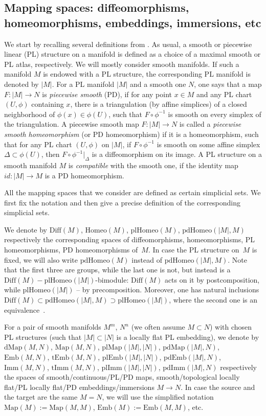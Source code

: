 \documentclass[11pt]{amsart}
\theoremstyle{definition}
\newcommand{\Emb}{\mathrm{Emb}}
\newcommand{\Imm}{\mathrm{Imm}}
\newcommand{\tImm}{\mathrm{tImm}}
\newcommand{\plImm}{\mathrm{plImm}}
\newcommand{\pdImm}{\mathrm{pdImm}}
\newcommand{\tEmb}{\mathrm{tEmb}}
\newcommand{\plEmb}{\mathrm{plEmb}}
\newcommand{\pdEmb}{\mathrm{pdEmb}}
\newcommand{\Map}{\mathrm{Map}}
\newcommand{\dMap}{\mathrm{dMap}}
\newcommand{\plMap}{\mathrm{plMap}}
\newcommand{\pdMap}{\mathrm{pdMap}}
\newcommand{\Diff}{\mathrm{Diff}}
\newcommand{\Homeo}{\mathrm{Homeo}}
\newcommand{\plHomeo}{\mathrm{plHomeo}}
\newcommand{\pdHomeo}{\mathrm{pdHomeo}}
\numberwithin{equation}{section}
\begin{document}
\subsection{Mapping spaces: diffeomorphisms, homeomorphisms, embeddings, immersions, etc}\label{ss:spaces}
We start by recalling several definitions from \cite{BLR_aut}.
As  usual, a smooth or piecewise linear (PL) structure on a manifold is defined as a choice of a maximal smooth or PL atlas, respectively. We will mostly consider smooth manifolds. 
If such a manifold $M$ is endowed with a  PL structure, the corresponding PL manifold is denoted by $|M|$. For a PL manifold $|M|$ and
a smooth one $N$, one says that a map $F\colon |M|\to N$ is {\it piecewise smooth} (PD), %
 if for any point $x\in M$ and any PL chart $(U,\phi)$ containing $x$,
there is a triangulation (by affine simplices) of a closed neighborhood of $\phi(x)\in \phi(U)$, such that $F\circ\phi^{-1}$ is smooth on every simplex of the triangulation. A piecewise smooth map $F\colon |M|\to N$ is called a {\it piecewise smooth homeomorphism} (or PD homeomorphism) if it is a homeomorphism,
such that for any PL chart $(U,\phi)$ on $|M|$, if $F\circ\phi^{-1}$ is smooth on some affine simplex $\Delta\subset\phi(U)$, then $F\circ\phi^{-1}|_\Delta$
is a diffeomorphism on its image. A PL structure on a smooth manifold $M$ is {\it compatible} with the smooth one, if the identity map $id\colon |M|\to M$
is a PD homeomorphism. 

All the mapping spaces that we consider are defined as certain simplicial sets. We first fix the notation and then give a precise definition of the
corresponding
simplicial sets.

We denote by $\Diff(M)$, $\Homeo(M)$, $\plHomeo(M)$, $\pdHomeo(|M|,M)$ respectively the corresponding spaces of diffeomorphisms, homeomorphisms, PL homeomorphisms, PD homeomorphisms of~$M$. In case  the PL structure on~$M$ is fixed, we will also write $\pdHomeo(M)$ instead of 
$\pdHomeo(|M|,M)$. Note that the first three are groups, while the last one is not, but instead is a $\Diff(M){-}\plHomeo(|M|)$-bimodule: $\Diff(M)$ acts on it by postcomposition, while $\plHomeo(|M|)$ -- by precomposition.  Moreover, one has natural inclusions $\Diff(M)\subset \pdHomeo(|M|,M)\supset \plHomeo(|M|)$,
where the second one is an equivalence~\cite{BLR_aut}.

For a pair of smooth manifolds $M^m$, $N^n$ (we often assume $M\subset N$) with chosen PL structures (such that $|M|\subset |N|$ is a locally flat PL embedding), we denote by $\dMap(M,N)$, $\Map(M,N)$, $\plMap(|M|,|N|)$, $\pdMap(|M|,N)$, $\Emb(M,N)$, $\tEmb(M,N)$, $\plEmb(|M|,|N|)$,
$\pdEmb(|M|,N)$, $\Imm(M,N)$, $\tImm(M,N)$, $\plImm(|M|,|N|)$, $\pdImm(|M|,N)$ respectively the spaces of smooth/continuous/PL/PD maps, smooth/topological locally
flat/PL locally flat/PD embeddings/immersions $M\to N$.  In case the source and the target are the same $M=N$, we will use the simplified notation $\Map(M):=\Map(M,M)$, $\Emb(M):=\Emb(M,M)$, etc.
\end{document}
